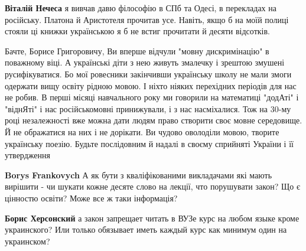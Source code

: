 \begin{itemize}
\begin{itemize}
\textbf{Віталій Нечеса} я вивчав давю філософію в СПб та Одесі, в перекладах на
російську. Платона й Аристотеля прочитав усе. Навіть, якщо б на моїй полиці
стояли ці книжки українською я б не встиг прочитати й десяти відсотків.

\end{itemize}

 

Бачте, Борисе Григоровичу, Ви вперше відчули "мовну дискримінацію" в поважному
віці. А українські діти з нею живуть змалечку і зрештою змушені русифікуватися.
Бо мої ровесники закінчивши українську школу не мали змоги одержати вищу освіту
рідною мовою. І ніхто ніяких перехідних періодів для нас не робив. В перші
місяці навчального року ми говорили на математиці "додАті" і "віднЯті" і нас
російськомовні принижували, і з нас насміхалися. Тож на 30-му році незалежності
вже можна дати людям право створити своє мовне середовище. Й не ображатися на
них і не дорікати. Ви чудово оволоділи мовою, творите українську поезію. Будьте
послідовним й надалі в своєму сприйняті України і її утвердження

\begin{itemize}
 
\textbf{Borys Frankovych} А як бути з кваліфікованими викладачами які мають вирішити - чи шукати кожне десяте слово на лекції, что порушувати закон? Що є цінностю освіти? Може все ж таки інформація?

 
\textbf{Борис Херсонский} а закон запрещает читать в ВУЗе курс на любом языке кроме украинского? Или только обязывает иметь каждый курс как минимум один на украинском?

 

\end{itemize}
\end{itemize}
